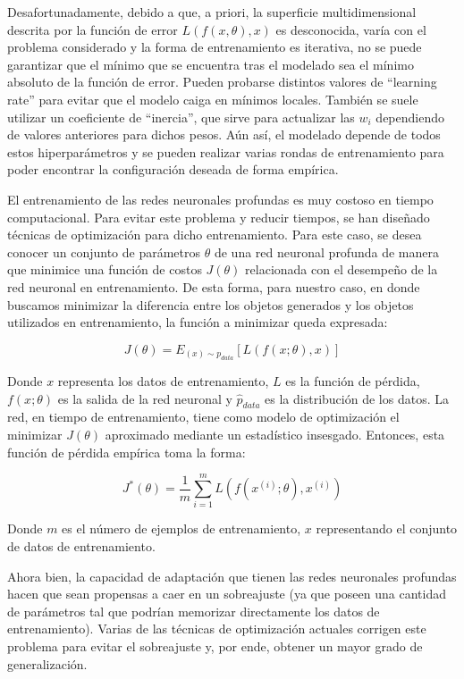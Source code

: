 \documentclass[12pt, spanish]{article}
\begin{document}
Desafortunadamente, debido a que, a priori, la superficie multidimensional
descrita por la función de error $L(f(x,\theta),x)$ es desconocida, varía con el problema
considerado y la forma de entrenamiento es iterativa, no se puede
garantizar que el mínimo que se encuentra tras el modelado sea el mínimo
absoluto de la función de error. Pueden probarse distintos valores de ``learning
rate'' para evitar que el modelo caiga en mínimos locales. También se suele
utilizar un coeficiente de ``inercia'', que sirve para actualizar las $w_i$
dependiendo de valores anteriores para dichos pesos. Aún así, el modelado
depende de todos estos hiperparámetros y se pueden realizar varias rondas de
entrenamiento para poder encontrar la configuración deseada de forma empírica.


El entrenamiento de las redes neuronales profundas es muy costoso
en tiempo computacional. Para evitar este problema y reducir tiempos,
se han diseñado técnicas de optimización para dicho entrenamiento.
Para este caso, se desea conocer un conjunto de parámetros $\theta$
de una red neuronal profunda de manera que minimice una función de
costos $J(\theta)$ relacionada con el desempeño de la red neuronal
en entrenamiento. De esta forma, para nuestro caso, en donde buscamos
minimizar la diferencia entre los objetos generados y los objetos
utilizados en entrenamiento, la función a minimizar queda expresada:

\[
J(\theta)=E_{(x)\sim p_{data}}[L(f(x;\theta),x)]
\]

Donde $x$ representa los datos de entrenamiento, $L$ es la función
de pérdida, $f(x;\theta)$ es la salida de la red neuronal y $\hat{p}_{data}$
es la distribución de los datos. La red, en tiempo de entrenamiento,
tiene como modelo de optimización el minimizar $J(\theta)$ aproximado
mediante un estadístico insesgado. Entonces, esta función de pérdida
empírica toma la forma:

\[
J^{*}(\theta)=\frac{1}{m}\sum_{i=1}^{m}L(f(x^{(i)};\theta),x^{(i)})
\]

Donde $m$ es el número de ejemplos de entrenamiento, $x$ representando
el conjunto de datos de entrenamiento.

Ahora bien, la capacidad de adaptación que tienen las redes neuronales
profundas hacen que sean propensas a caer en un sobreajuste (ya que poseen
una cantidad de parámetros tal que podrían memorizar directamente los datos
de entrenamiento). Varias de las técnicas de optimización actuales corrigen
este problema para evitar el sobreajuste y, por ende, obtener un mayor grado
de generalización.
\end{document}
